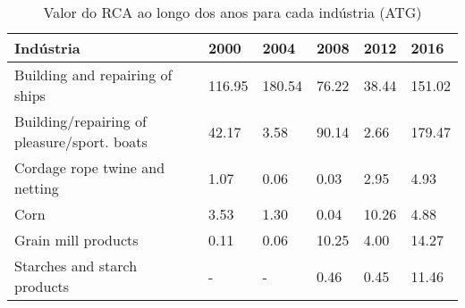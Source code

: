 \begin{table}
\centering
\caption{Valor do RCA ao longo dos anos para cada indústria (ATG)}
\begin{tabular}{p{6cm}p{1.5cm}p{1.5cm}p{1.5cm}p{1.5cm}p{1.5cm}}
\toprule
                                  Indústria &   2000 &   2004 &  2008 &  2012 &   2016 \\
\midrule
            Building and repairing of ships & 116.95 & 180.54 & 76.22 & 38.44 & 151.02 \\
Building/repairing of pleasure/sport. boats &  42.17 &   3.58 & 90.14 &  2.66 & 179.47 \\
             Cordage rope twine and netting &   1.07 &   0.06 &  0.03 &  2.95 &   4.93 \\
                                       Corn &   3.53 &   1.30 &  0.04 & 10.26 &   4.88 \\
                        Grain mill products &   0.11 &   0.06 & 10.25 &  4.00 &  14.27 \\
               Starches and starch products &      - &      - &  0.46 &  0.45 &  11.46 \\
\bottomrule
\end{tabular}
\end{table}
